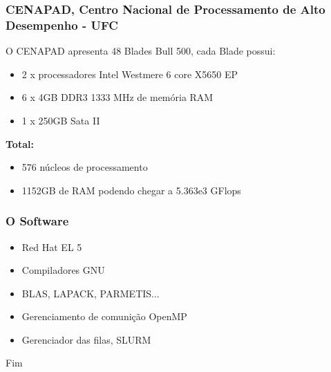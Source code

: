\documentclass{beamer}
\begin{document}
\begin{frame}
    \frametitle{CENAPAD, Centro Nacional de Processamento de Alto Desempenho - UFC}
    
    O CENAPAD apresenta 48 Blades Bull 500, cada Blade possui:
    \begin{itemize}
        \item 2 x processadores Intel Westmere 6 core X5650 EP
        \item 6 x 4GB DDR3 1333 MHz de memória RAM
        \item 1 x 250GB Sata II
    \end{itemize}

    \textbf{Total:}
    \begin{itemize}
        \item 576 núcleos de processamento
        \item 1152GB de RAM podendo chegar a 5.363e3 GFlops
    \end{itemize}
\end{frame}

\begin{frame}
    \frametitle{O Software}
    \begin{itemize}
        \item Red Hat EL 5
        \item Compiladores GNU
        \item BLAS, LAPACK, PARMETIS...
        \item Gerenciamento de comunição OpenMP
        \item Gerenciador das filas, SLURM
    \end{itemize}
\end{frame}

\begin{frame}
\Huge{\centerline{Fim}}
\end{frame}
\end{document}
